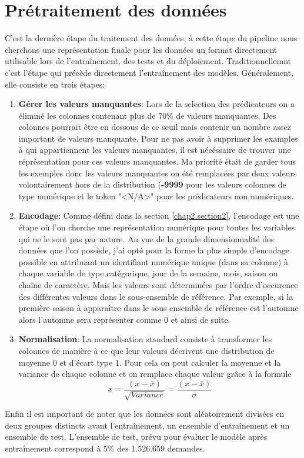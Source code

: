 \section{Prétraitement des données}
\label{chap3.section3}
C'est la dernière étape du traitement des données, à cette étape du pipeline nous cherchons une représentation finale pour les données un format directement utilisable lors de l'entraînement, des tests et du déploiement. Traditionnellemnt c'est l'étape qui précède directement l'entraînement des modèles. Généralement, elle consiste en trois étapes:

\begin{enumerate}
    \item \textbf{Gérer les valeurs manquantes}: Lors de la selection des prédicateurs on a éliminé les colonnes contenant plus de 70\% de valeurs manquantes. Des colonnes pourrait être en dessous de ce seuil mais contenir un nombre assez important de valeurs manquante. Pour ne pas avoir à supprimer les examples à qui appartiennent les valeurs manquantes, il est nécéssaire de trouver une réprésentation pour ces valeurs manquantes. Ma priorité était de garder tous les exemples donc les valeurs manquantes on été remplacées par deux valeurs volontairement hors de la distribution (\textbf{-9999} pour les valeurs colonnes de type numérique et le token "<N/A>" pour les prédicateurs non numériques.
    \item \textbf{Encodage}: Comme défini dans la section \ref{chap2.section2}, l'encodage est une étape où l'on cherche une représentation numérique pour toutes les variables qui ne le sont pas par nature. Au vue de la grande dimensionnalité des données que l'on possède, j'ai opté pour la forme la plus simple d'encodage possible en attribuant un identifiant numérique unique (dans sa colonne) à chaque variable de type catégorique, jour de la semaine, mois, saison ou chaîne de caractère. Mais les valeurs sont déterminées par l'ordre d'occurence des différentes valeurs dans le sous-ensemble de référence. Par exemple, si la première saison à apparaître dans le sous ensemble de référence est l'automne alors l'automne sera représenter comme 0 et ainsi de suite.
    \item \textbf{Normalisation}: La normalisation standard consiste à transformer les colonnes de manière à ce que leur valeurs décrivent une distribution de moyenne 0 et d'écart type 1. Pour cela on peut calculer la moyenne et la variance de chaque colonne et on remplace chaque valeur grâce à la formule \[x = \frac{(x - \bar{x})}{\sqrt{Variance}} = \frac{(x - \bar{x})}{\sigma}\]
\end{enumerate}

Enfin il est important de noter que les données sont aléatoirement divisées en deux groupes distincts avant l'entraînement, un ensemble d'entraînement et un ensemble de test. L'ensemble de test, prévu pour évaluer le modèle après entraînement correspond à 5\% des 1.526.659 demandes. 